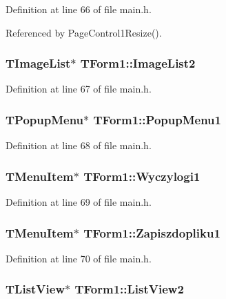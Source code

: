 Definition at line 66 of file main.h.

Referenced by PageControl1Resize().\hypertarget{classTForm1_a1eb1de6f757fe4c219614eaa489d58c}{
\subsubsection[ImageList2]{\setlength{\rightskip}{0pt plus 5cm}TImageList$\ast$ {\bf TForm1::ImageList2}}}
\label{classTForm1_a1eb1de6f757fe4c219614eaa489d58c}




Definition at line 67 of file main.h.\hypertarget{classTForm1_2a7d717ee18c4392e29c02fb252d5edf}{
\subsubsection[PopupMenu1]{\setlength{\rightskip}{0pt plus 5cm}TPopupMenu$\ast$ {\bf TForm1::PopupMenu1}}}
\label{classTForm1_2a7d717ee18c4392e29c02fb252d5edf}




Definition at line 68 of file main.h.\hypertarget{classTForm1_9dcb2c2b046afeb5bd3d1e6110233ca1}{
\subsubsection[Wyczylogi1]{\setlength{\rightskip}{0pt plus 5cm}TMenuItem$\ast$ {\bf TForm1::Wyczylogi1}}}
\label{classTForm1_9dcb2c2b046afeb5bd3d1e6110233ca1}




Definition at line 69 of file main.h.\hypertarget{classTForm1_9daa7303230ddb9903f9ed31489bf9bd}{
\subsubsection[Zapiszdopliku1]{\setlength{\rightskip}{0pt plus 5cm}TMenuItem$\ast$ {\bf TForm1::Zapiszdopliku1}}}
\label{classTForm1_9daa7303230ddb9903f9ed31489bf9bd}




Definition at line 70 of file main.h.\hypertarget{classTForm1_f2bf95d7f40c9081bff58919fac42e27}{
\subsubsection[ListView2]{\setlength{\rightskip}{0pt plus 5cm}TListView$\ast$ {\bf TForm1::ListView2}}}
\label{classTForm1_f2bf95d7f40c9081bff58919fac42e27}




